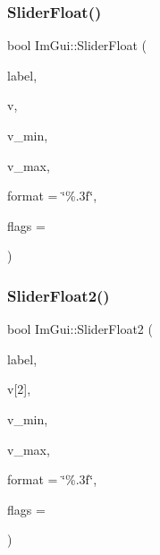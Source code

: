 \mbox{\label{namespaceImGui_a864f761801792a0cc5ce3408f3392cfc}} 
\subsubsection{\texorpdfstring{Slider\+Float()}{SliderFloat()}}
{\footnotesize\ttfamily bool Im\+Gui\+::\+Slider\+Float (\begin{DoxyParamCaption}\item[{const char $\ast$}]{label,  }\item[{float $\ast$}]{v,  }\item[{float}]{v\+\_\+min,  }\item[{float}]{v\+\_\+max,  }\item[{const char $\ast$}]{format = {\ttfamily \char`\"{}\%.3f\char`\"{}},  }\item[{Im\+Gui\+Slider\+Flags}]{flags = {} }\end{DoxyParamCaption})}

\mbox{\label{namespaceImGui_a65ed4a55f13d467b06075c951b310c23}} 
\subsubsection{\texorpdfstring{Slider\+Float2()}{SliderFloat2()}}
{\footnotesize\ttfamily bool Im\+Gui\+::\+Slider\+Float2 (\begin{DoxyParamCaption}\item[{const char $\ast$}]{label,  }\item[{float}]{v\mbox{[}2\mbox{]},  }\item[{float}]{v\+\_\+min,  }\item[{float}]{v\+\_\+max,  }\item[{const char $\ast$}]{format = {\ttfamily \char`\"{}\%.3f\char`\"{}},  }\item[{Im\+Gui\+Slider\+Flags}]{flags = {} }\end{DoxyParamCaption})}

\mbox{\label{namespaceImGui_a9fb9ae936849ae17be13c9b6a0391585}} 
